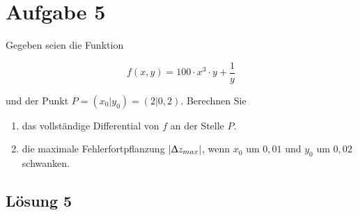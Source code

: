 \documentclass[main.tex]{subfiles}
\begin{document}
\section{Aufgabe 5}
Gegeben seien die Funktion

\begin{equation*}
    f(x, y) = 100 \cdot x^3 \cdot y + \frac{1}{y}
\end{equation*}

und der Punkt $P = (x_0 | y_0) = (2 | 0,2)$. Berechnen Sie

\begin{enumerate}
    \item das vollständige Differential von $f$ an der Stelle $P$.
    \item die maximale Fehlerfortpflanzung $|\Updelta z_{max}|$, wenn $x_0$ um $0,01$ und $y_0$ um $0,02$ schwanken.
\end{enumerate}


\subsection{Lösung 5}
\end{document}
